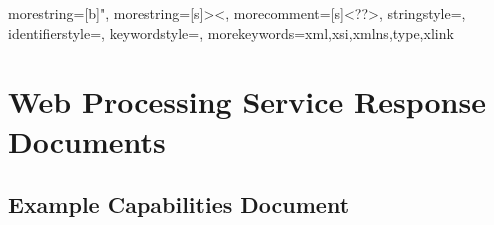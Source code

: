 
{
	morestring=[b]",
	morestring=[s]{>}{<},
	morecomment=[s]{<?}{?>},
	stringstyle=\color{black},
	identifierstyle=\color{darkblue},
	keywordstyle=\color{cyan},
	morekeywords={xml,xsi,xmlns,type,xlink}%
}


\chapter{Web Processing Service Response Documents}
\label{app:WPS}

\section{Example Capabilities Document}
\label{app:wpsCapabilities}
